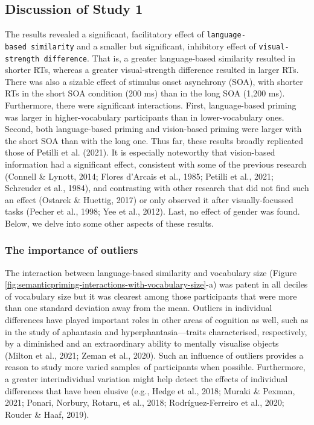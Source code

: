 \documentclass[
  12pt,
  man,floatsintext]{apa7}
\begin{document}
\hypertarget{discussion-of-study-1}{%
\subsection{Discussion of Study 1}\label{discussion-of-study-1}}

The results revealed a significant, facilitatory effect of \texttt{language-based\ similarity} and a smaller but significant, inhibitory effect of \texttt{visual-strength\ difference}. That is, a greater language-based similarity resulted in shorter RTs, whereas a greater visual-strength difference resulted in larger RTs. There was also a sizable effect of stimulus onset asynchrony (SOA), with shorter RTs in the short SOA condition (200 ms) than in the long SOA (1,200 ms). Furthermore, there were significant interactions. First, language-based priming was larger in higher-vocabulary participants than in lower-vocabulary ones. Second, both language-based priming and vision-based priming were larger with the short SOA than with the long one. Thus far, these results broadly replicated those of Petilli et al. (2021). It is especially noteworthy that vision-based information had a significant effect, consistent with some of the previous research (Connell \& Lynott, 2014; Flores d'Arcais et al., 1985; Petilli et al., 2021; Schreuder et al., 1984), and contrasting with other research that did not find such an effect (Ostarek \& Huettig, 2017) or only observed it after visually-focussed tasks (Pecher et al., 1998; Yee et al., 2012). Last, no effect of gender was found. Below, we delve into some other aspects of these results.

\hypertarget{the-importance-of-outliers}{%
\subsubsection{The importance of outliers}\label{the-importance-of-outliers}}

The interaction between language-based similarity and vocabulary size (Figure \ref{fig:semanticpriming-interactions-with-vocabulary-size}-a) was patent in all deciles of vocabulary size but it was clearest among those participants that were more than one standard deviation away from the mean. Outliers in individual differences have played important roles in other areas of cognition as well, such as in the study of aphantasia and hyperphantasia---traits characterised, respectively, by a diminished and an extraordinary ability to mentally visualise objects (Milton et al., 2021; Zeman et al., 2020). Such an influence of outliers provides a reason to study more varied samples~of participants when possible. Furthermore, a greater interindividual variation might help detect the effects of individual differences that have been elusive (e.g., Hedge et al., 2018; Muraki \& Pexman, 2021; Ponari, Norbury, Rotaru, et al., 2018; Rodríguez-Ferreiro et al., 2020; Rouder \& Haaf, 2019).
\end{document}
